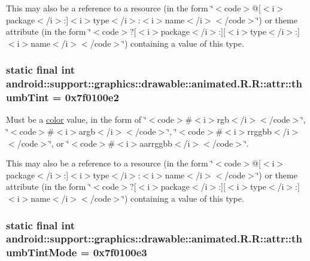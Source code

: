 This may also be a reference to a resource (in the form \char`\"{}$<$code$>$@\mbox{[}$<$i$>$package$<$/i$>$:\mbox{]}$<$i$>$type$<$/i$>$:$<$i$>$name$<$/i$>$$<$/code$>$\char`\"{}) or theme attribute (in the form \char`\"{}$<$code$>$?\mbox{[}$<$i$>$package$<$/i$>$:\mbox{]}\mbox{[}$<$i$>$type$<$/i$>$:\mbox{]}$<$i$>$name$<$/i$>$$<$/code$>$\char`\"{}) containing a value of this type. \hypertarget{classandroid_1_1support_1_1graphics_1_1drawable_1_1animated_1_1_r_1_1attr_35bf7dbccce67bb6e4268160943fb376}{
\subsubsection[{thumbTint}]{\setlength{\rightskip}{0pt plus 5cm}static final int android::support::graphics::drawable::animated.R.R::attr::thumbTint = 0x7f0100e2}}
\label{classandroid_1_1support_1_1graphics_1_1drawable_1_1animated_1_1_r_1_1attr_35bf7dbccce67bb6e4268160943fb376}


Must be a \hyperlink{classandroid_1_1support_1_1graphics_1_1drawable_1_1animated_1_1_r_1_1color}{color} value, in the form of \char`\"{}$<$code$>$\#$<$i$>$rgb$<$/i$>$$<$/code$>$\char`\"{}, \char`\"{}$<$code$>$\#$<$i$>$argb$<$/i$>$$<$/code$>$\char`\"{}, \char`\"{}$<$code$>$\#$<$i$>$rrggbb$<$/i$>$$<$/code$>$\char`\"{}, or \char`\"{}$<$code$>$\#$<$i$>$aarrggbb$<$/i$>$$<$/code$>$\char`\"{}. 

This may also be a reference to a resource (in the form \char`\"{}$<$code$>$@\mbox{[}$<$i$>$package$<$/i$>$:\mbox{]}$<$i$>$type$<$/i$>$:$<$i$>$name$<$/i$>$$<$/code$>$\char`\"{}) or theme attribute (in the form \char`\"{}$<$code$>$?\mbox{[}$<$i$>$package$<$/i$>$:\mbox{]}\mbox{[}$<$i$>$type$<$/i$>$:\mbox{]}$<$i$>$name$<$/i$>$$<$/code$>$\char`\"{}) containing a value of this type. \hypertarget{classandroid_1_1support_1_1graphics_1_1drawable_1_1animated_1_1_r_1_1attr_4effb516ccbacc8275a70347096ca08d}{
\subsubsection[{thumbTintMode}]{\setlength{\rightskip}{0pt plus 5cm}static final int android::support::graphics::drawable::animated.R.R::attr::thumbTintMode = 0x7f0100e3}}
\label{classandroid_1_1support_1_1graphics_1_1drawable_1_1animated_1_1_r_1_1attr_4effb516ccbacc8275a70347096ca08d}


